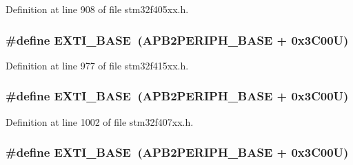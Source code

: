 Definition at line 908 of file stm32f405xx.\+h.

\subsubsection[{\texorpdfstring{E\+X\+T\+I\+\_\+\+B\+A\+SE}{EXTI_BASE}}]{\setlength{\rightskip}{0pt plus 5cm}\#define E\+X\+T\+I\+\_\+\+B\+A\+SE~({\bf A\+P\+B2\+P\+E\+R\+I\+P\+H\+\_\+\+B\+A\+SE} + 0x3\+C00\+U)}\hypertarget{group___peripheral__registers__structures_ga87371508b3bcdcd98cd1ec629be29061}{}\label{group___peripheral__registers__structures_ga87371508b3bcdcd98cd1ec629be29061}


Definition at line 977 of file stm32f415xx.\+h.

\subsubsection[{\texorpdfstring{E\+X\+T\+I\+\_\+\+B\+A\+SE}{EXTI_BASE}}]{\setlength{\rightskip}{0pt plus 5cm}\#define E\+X\+T\+I\+\_\+\+B\+A\+SE~({\bf A\+P\+B2\+P\+E\+R\+I\+P\+H\+\_\+\+B\+A\+SE} + 0x3\+C00\+U)}\hypertarget{group___peripheral__registers__structures_ga87371508b3bcdcd98cd1ec629be29061}{}\label{group___peripheral__registers__structures_ga87371508b3bcdcd98cd1ec629be29061}


Definition at line 1002 of file stm32f407xx.\+h.

\subsubsection[{\texorpdfstring{E\+X\+T\+I\+\_\+\+B\+A\+SE}{EXTI_BASE}}]{\setlength{\rightskip}{0pt plus 5cm}\#define E\+X\+T\+I\+\_\+\+B\+A\+SE~({\bf A\+P\+B2\+P\+E\+R\+I\+P\+H\+\_\+\+B\+A\+SE} + 0x3\+C00\+U)}\hypertarget{group___peripheral__registers__structures_ga87371508b3bcdcd98cd1ec629be29061}{}\label{group___peripheral__registers__structures_ga87371508b3bcdcd98cd1ec629be29061}


